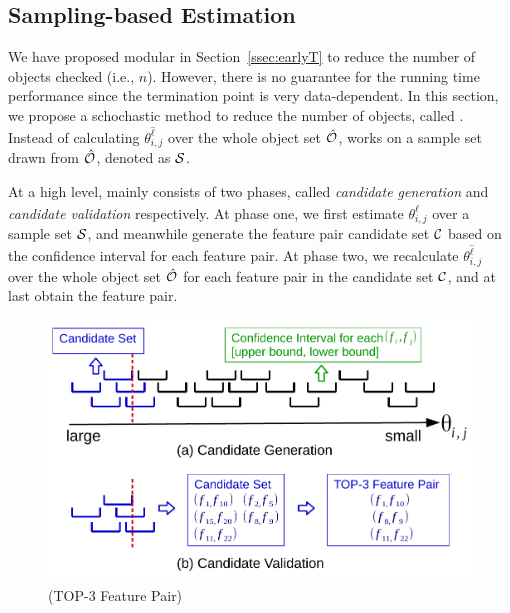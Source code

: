 \subsection{Sampling-based Estimation} \label{ssec:sampling}
We have proposed \earlyT modular in Section~\ref{ssec:earlyT} to reduce the number of objects checked (i.e., $n$). However, there is no guarantee for the running time performance since the termination point is very data-dependent. In this section, we propose a schochastic method to reduce the number of objects, called \sampling. Instead of calculating $\theta_{i,j}^{\hat{\ell}}$ over the whole object set $\hat{\oo}$, \sampling works on a sample set drawn from $\hat{\oo}$, denoted as $\sss$.

 At a high level, \sampling mainly consists of two phases, called {\em candidate generation} and {\em candidate validation} respectively. At phase one, we first estimate $\theta_{i,j}^{\hat{\ell}}$ over a sample set $\sss$, and meanwhile generate the feature pair candidate set $\cc$ based on the confidence interval for each feature pair. At phase two, we recalculate $\theta_{i,j}^{\hat{\ell}}$ over the whole object set $\hat{\oo}$ for each feature pair in the candidate set $\cc$, and at last obtain the \topk feature pair. 
\begin{figure}[h]
  \centering
  \vspace{-4mm}
  \includegraphics[width=\linewidth]{fig/sampling.pdf}
  \vspace{-6mm}
\caption{\sampling (TOP-3 Feature Pair)}
\label{fig:sampling}
\end{figure} 
